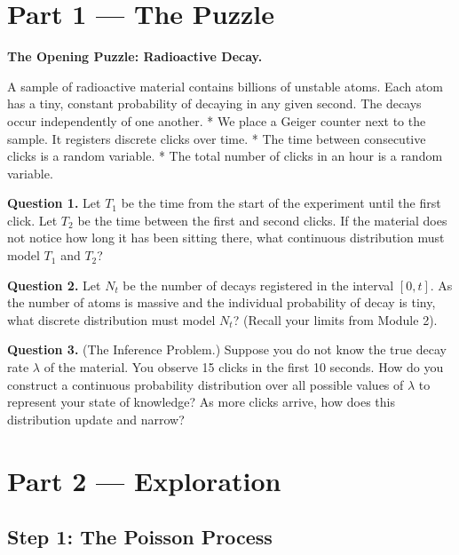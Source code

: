 \documentclass[12pt, a4paper]{article}
\begin{document}
\newpage

\section{Part 1 \texorpdfstring{---}{--} The Puzzle}

\begin{puzzlebox}
\textbf{The Opening Puzzle: Radioactive Decay.}

A sample of radioactive material contains billions of unstable atoms. Each atom has a tiny, constant probability of decaying in any given second. The decays occur independently of one another.
* We place a Geiger counter next to the sample. It registers discrete clicks over time.
* The time between consecutive clicks is a random variable.
* The total number of clicks in an hour is a random variable.

\medskip
\textbf{Question 1.} Let $T_1$ be the time from the start of the experiment until the first click. Let $T_2$ be the time between the first and second clicks. If the material does not notice how long it has been sitting there, what continuous distribution must model $T_1$ and $T_2$?

\textbf{Question 2.} Let $N_t$ be the number of decays registered in the interval $[0, t]$. As the number of atoms is massive and the individual probability of decay is tiny, what discrete distribution must model $N_t$? (Recall your limits from Module 2).

\textbf{Question 3.} (The Inference Problem.) Suppose you do not know the true decay rate $\lambda$ of the material. You observe 15 clicks in the first 10 seconds. How do you construct a continuous probability distribution over all possible values of $\lambda$ to represent your state of knowledge? As more clicks arrive, how does this distribution update and narrow?
\end{puzzlebox}

\newpage

\section{Part 2 \texorpdfstring{---}{--} Exploration}

\subsection{Step 1: The Poisson Process}
\end{document}
